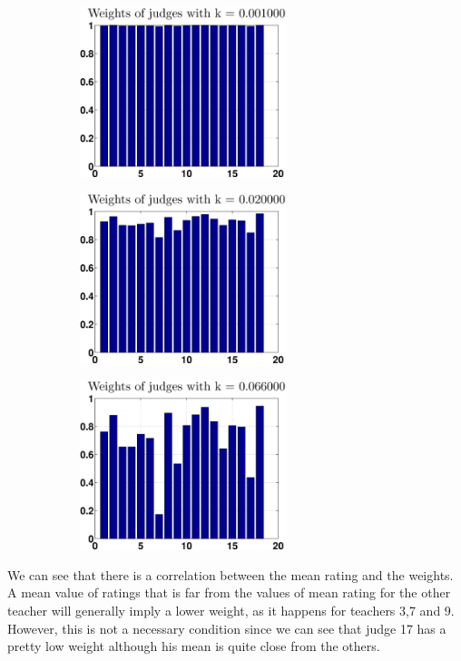 \documentclass[12pt,a4paper]{article}
\begin{document}
\begin{figure}
\centering
\begin{subfigure}[b]{0.48\textwidth}
\includegraphics[width = 6cm]{noPreprocess/weightsk10.eps}
\end{subfigure}
\begin{subfigure}[b]{0.48\textwidth}
\includegraphics[width = 6cm]{noPreprocess/weightsk200.eps}
\end{subfigure}
\begin{subfigure}[b]{0.5\textwidth}
\includegraphics[width = 6cm]{noPreprocess/weightsk660.eps}
\end{subfigure}
\end{figure}
We can see that there is a correlation between the mean rating and the weights. A mean value of ratings that is far from the values of mean rating for the other teacher will generally imply a lower weight, as it happens for teachers 3,7 and 9. However, this is not a necessary condition since we can see that judge 17 has a pretty low weight although his mean is quite close from the others.\\
\end{document}
